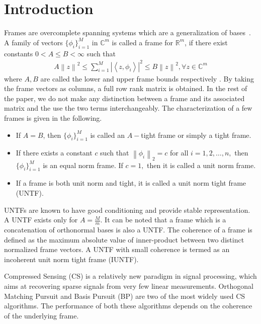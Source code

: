 \documentclass{IEEEtran}
\begin{document}
\section{Introduction}
Frames are overcomplete spanning systems which are a generalization of
bases~\cite{chris_2003, Gita_2013}. 
A family of vectors $\{\phi_{i}\}^{M}_{i=1}$ in $\mathbb{C}^{m}$ is called a
frame for $\mathbb{R}^{m}$,
if there exist constants $0 < A \leq B < \infty$ such that
\begin{align*}
  A\left\|z\right\|^{2} \leq \sum^{M}_{i=1}\left|\left\langle z,
  \phi_{i}\right\rangle\right|^{2} \leq B\left\|z\right\|^{2}, \forall z \in \mathbb{C}^{m} 
\end{align*}
\noindent where $A,B$ are called the lower and upper frame bounds respectively \cite{chris_2003}.
By taking the frame vectors as columns, a full row rank matrix is obtained.
In the rest of the paper, we do not make any distinction between a frame
and its associated matrix and the use the two terms interchangeably. The characterization of a few frames is given in the
following. 
\begin{itemize}
\item If $A=B$, then $\{ \phi_{i} \}^{M}_{i=1}$ is called an $A-$tight frame or simply a
  tight frame.
\item If there exists a constant $c$ such that $\left\|\phi_{i}\right\|_{2} = c$
  for all $i= 1,2,\ldots, n,$ then $\{ \phi_{i} \}^{M}_{i=1}$ is an equal norm frame.
  If $c=1,$ then it is called a unit norm frame.
\item If a frame is both unit norm and tight, it is called a unit norm tight
  frame (UNTF). 

\end{itemize}

UNTFs are known to have good conditioning and provide stable representation. A UNTF exists only for $A = \frac{M}{m}$. It can be noted that a frame which is a concatenation of orthonormal bases is also a UNTF. The coherence of a frame is defined as the maximum absolute value of inner-product between two distinct normalized frame vectors. A UNTF with small
coherence is termed as an incoherent unit norm tight frame (IUNTF).

Compressed Sensing (CS)
\cite{can_2008,elad_2010} is a relatively
new paradigm in signal processing, which aims at recovering sparse signals
from very few linear measurements. Orthogonal Matching Pursuit
and Basis Pursuit (BP) are two of the most widely used CS algorithms. The
performance of both these algorithms depends on the coherence of the underlying
frame.
\end{document}
